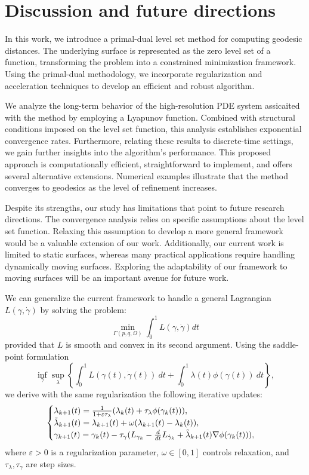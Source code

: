 \documentclass[12pt]{amsart}
\theoremstyle{definition}
\theoremstyle{remark}
\numberwithin{equation}{section}
\numberwithin{equation}{section}
\begin{document}
\section{Discussion and future directions}  

In this work, we introduce a primal-dual level set method for computing geodesic distances. The underlying surface is represented as the zero level set of
a function, transforming the problem into a constrained minimization framework. Using  the primal-dual methodology, we incorporate  regularization and acceleration techniques to develop an efficient and robust algorithm. 

We analyze the long-term behavior of the high-resolution PDE system assicaited with the method by employing a Lyapunov function. Combined with structural conditions imposed on the level set function, this analysis establishes exponential convergence rates. 
Furthermore, relating  these results to discrete-time settings, we gain further  insights into the algorithm's performance. This proposed approach is computationally efficient, straightforward to implement, and offers several alternative extensions. Numerical examples illustrate that the method converges to geodesics as the level of refinement increases. 

Despite its strengths, our study has limitations that point to future research  directions. The convergence analysis relies on specific assumptions about the level set function. Relaxing this assumption to develop a more general framework would be a valuable extension of our work. Additionally, our current work is limited to static surfaces, whereas many practical 
applications require handling dynamically 
moving surfaces. Exploring the adaptability of our framework to moving surfaces  will be an important avenue for future work.

We can generalize the current framework to handle a general Lagrangian $L(\gamma, \dot\gamma)$ by solving the problem:  
\[
\min_{\Gamma(p, q, \Omega)} \int_0^1 L(\gamma, \dot\gamma)dt
\]
provided that $L$ is smooth and convex in its second argument. Using the saddle-point formulation 
\[
\inf_{\gamma}\sup_{\lambda} \left\{ \int_0^1 L(\gamma(t), \dot{\gamma}(t))~dt  + \int_0^1 \lambda(t)\phi(\gamma(t))~dt\right\}, 
\]
we derive with the same regularization the following iterative updates:   
\begin{equation*}\begin{cases}
    \lambda_{k+1}(t) = \frac{1}{1+\varepsilon\tau_{\lambda}}(\lambda_k(t)+\tau_{\lambda}\phi(\gamma_{k}(t))), \\
    \Tilde{\lambda}_{k+1}(t) = \lambda_{k+1}(t)+ \omega(\lambda_{k+1}(t)-\lambda_k(t)),\\
    \gamma_{k+1}(t) = \gamma_k(t) - \tau_{\gamma}(L_{\gamma_k} -\frac{d}{dt} L_{\dot{\gamma}_k} +\Tilde{\lambda}_{k+1}(t)\nabla\phi(\gamma_k(t))),
\end{cases}\end{equation*}
where $\varepsilon>0$ is a regularization parameter,  $\omega \in [0, 1]$ controls relaxation, and $\tau_\lambda, \tau_\gamma$ are  step sizes.



\end{document}
